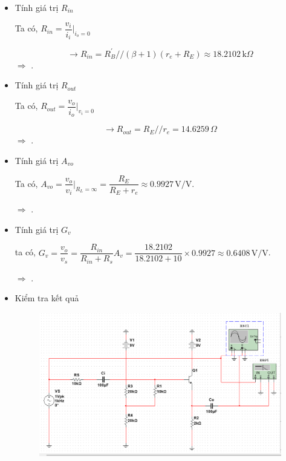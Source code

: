 \begin{itemize}[label=-]
	\item Tính giá trị $R_{in}$
	
	Ta có, $R_{in} = \dfrac{v_{i}}{i_{i}}\bigg|_{i_{o} = 0}$

	\[ \rightarrow R_{in} = R_{B}^{'} // (\beta + 1)(r_{e} + R_{E}) \approx 18.2102\,\text{k}\Omega \]
	$\Rightarrow$ .
	
	\item Tính giá trị $R_{out}$
	
	Ta có, $R_{out} = \dfrac{v_{o}}{i_{o}}\bigg|_{v_{i} = 0}$ 
	
	\[\rightarrow R_{out} = R_{E} // r_{e} = 14.6259\,\Omega \]
	$\Rightarrow$ .
	
	\item Tính giá trị $A_{vo}$
	
	Ta có, $A_{vo} = \dfrac{v_{o}}{v_{i}}\bigg|_{R_{L} = \infty} = \dfrac{R_{E}}{R_{E} + r_{e}} \approx 0.9927\,\text{V/V}$.
	
	$\Rightarrow$ .
	
	\item Tính giá trị $G_{v}$
	
	ta có, $G_{v} = \dfrac{v_{o}}{v_{s}} = \dfrac{R_{in}}{R_{in} + R_{s}} A_{v} = \dfrac{18.2102}{18.2102 + 10}\times 0.9927 \approx 0.6408 \,\text{V/V}$.
	
	$\Rightarrow$ . 
	
	\item Kiểm tra kết quả
	
	\begin{figure}[H]
		\centering
		\includegraphics[width=.8\linewidth]{./my-chapters/my-images/Question4/cauc_test.png}
	\end{figure}
	

\end{itemize}
